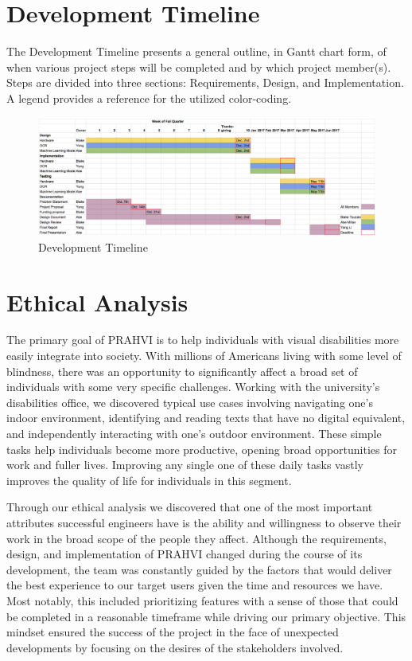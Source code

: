 \chapter{Development Timeline}
The Development Timeline presents a general outline, in Gantt chart form, of when various project steps will be completed and by which project member(s). Steps are divided into three sections: Requirements, Design, and Implementation. A legend provides a reference for the utilized color-coding.
\begin{figure}
	\label{fig:developmentTimeline}
	\centering
	\includegraphics[angle = 90, scale = 0.8]{developmentTimeline.png}
    
    \caption{Development Timeline}
\end{figure}



\chapter{Ethical Analysis}
	The primary goal of PRAHVI is to help individuals with visual disabilities more easily integrate into society. With millions of Americans living with some level of blindness, there was an opportunity to significantly affect a broad set of individuals with some very specific challenges. Working with the university's disabilities office, we discovered typical use cases involving navigating one's indoor environment, identifying and reading texts that have no digital equivalent, and independently interacting with one's outdoor environment. These simple tasks help individuals become more productive, opening broad opportunities for work and fuller lives. Improving any single one of these daily tasks vastly improves the quality of life for individuals in this segment.
	
	Through our ethical analysis we discovered that one of the most important attributes successful engineers have is the ability and willingness to observe their work in the broad scope of the people they affect. Although the requirements, design, and implementation of PRAHVI changed during the course of its development, the team was constantly guided by the factors that would deliver the best experience to our target users given the time and resources we have. Most notably, this included prioritizing features with a sense of those that could be completed in a reasonable timeframe while driving our primary objective. This mindset ensured the success of the project in the face of unexpected developments by focusing on the desires of the stakeholders involved.
	
